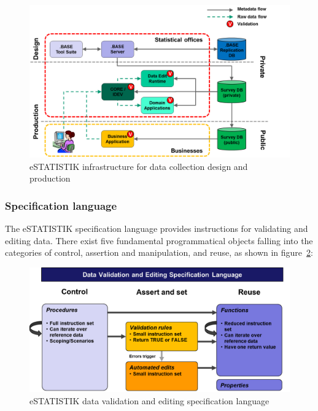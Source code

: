 \begin{figure}[!ht]
\begin{center}
\includegraphics[scale=0.5]{fig/estatinfra.png} 
\end{center}
\caption{eSTATISTIK infrastructure for data collection design and production}
\label{estatinfra}
\end{figure}

\subsubsection{Specification language}

The eSTATISTIK specification language provides instructions for validating and editing data. There exist five fundamental programmatical objects falling into the categories of control, assertion and manipulation, and reuse, as shown in figure~\ref{estatspecl}:

\begin{figure}[!ht]
\begin{center}
\includegraphics[scale=0.5]{fig/estatspecl.png} 
\end{center}
\caption{eSTATISTIK data validation and editing specification language}
\label{estatspecl}
\end{figure}

